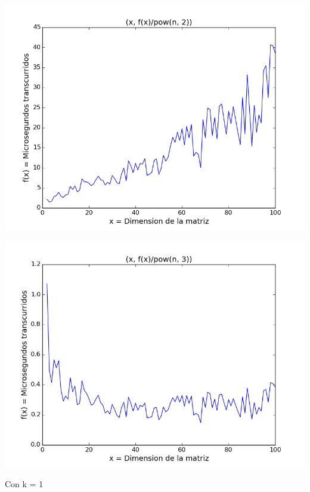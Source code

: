 \begin{center}
\includegraphics[scale=0.54]{images/0potenciasobrecuadrado}
\end{center}


\begin{center}
\includegraphics[scale=0.54]{images/0potenciasobrecubo}
\end{center}
\vspace{2mm}
\vspace{2mm}
\vspace{2mm}

Con k = 1

